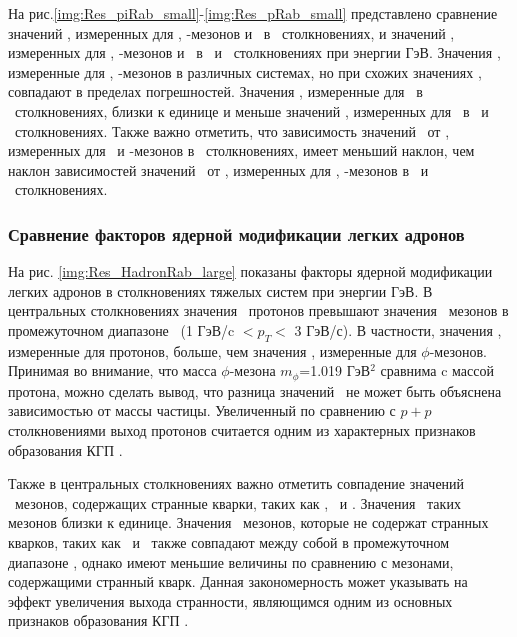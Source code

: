 На рис.\ref{img:Res_piRab_small}-\ref{img:Res_pRab_small} представлено сравнение значений \rab, измеренных для  \pipm, \Kpm-мезонов и \aprot \ в \pal \ столкновениях, и значений \rab, измеренных для \pipm, \Kpm-мезонов и \prots \ в \dau \ и \heau \ столкновениях при энергии  ГэВ. Значения \rab, измеренные для \pipm, \Kpm-мезонов в различных системах, но при схожих значениях \Npart, совпадают в пределах погрешностей. Значения \rab, измеренные для \aprot \ в \pal \ столкновениях, близки к единице и меньше значений \rab, измеренных для \prots \ в \heau \ и \dau \ столкновениях. Также важно отметить, что зависимость значений \rab \ от \pt, измеренных для \pipm \ и \Kpm-мезонов в \pal \ столкновениях, имеет меньший наклон, чем наклон зависимостей значений \rab \ от \pt, измеренных для \pipm, \Kpm-мезонов в \dau \ и \heau \ столкновениях. 

\subsubsection{Сравнение факторов ядерной модификации легких адронов}
На рис. \ref{img:Res_HadronRab_large} показаны факторы ядерной модификации легких адронов в столкновениях тяжелых систем при энергии  ГэВ. В центральных столкновениях значения \rab \ протонов превышают значения \rab \ мезонов в промежуточном диапазоне \pt \ (1 ГэВ/c $< p_T <$ 3 ГэВ/с). В частности, значения \rab, измеренные для протонов, больше, чем значения \rab, измеренные для $\phi$-мезонов. Принимая во внимание, что масса $\phi$-мезона $m_{\phi}$=1.019 ГэВ$^{2}$ сравнима c массой протона, можно сделать вывод, что разница значений \rab \ не может быть объяснена зависимостью от массы частицы.  Увеличенный по сравнению с $p+p$ столкновениями выход протонов считается одним из характерных признаков образования КГП \cite{BaryonPuzzleVelkovska, BaryonPuzzle2002, BaryonPuzzleHeavy}.

Также в центральных столкновениях важно отметить совпадение значений \rab \ мезонов, содержащих странные кварки, таких как \Kstar, \phim \ и \Kpm. Значения \rab \ таких мезонов близки к единице. Значения \rab \ мезонов, которые не содержат странных кварков, таких как \pio \ и \pipm  \ также совпадают между собой в промежуточном диапазоне \pt, однако имеют меньшие величины по сравнению с мезонами, содержащими странный кварк. Данная закономерность может указывать на эффект увеличения выхода странности, являющимся одним из основных признаков образования КГП \cite{Strangeness_QGP, StrangEnh, ThermalStrangeness}.

